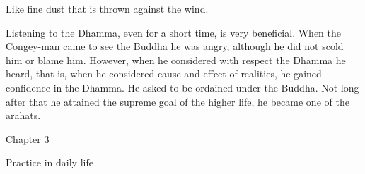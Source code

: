 \documentclass[12pt,twoside]{article}
\begin{document}
Like fine dust that is thrown against the wind.


\bigskip

Listening to the Dhamma, even for a short time, is very beneficial. When
the Congey{}-man came to see the Buddha he was angry, although he did
not scold him or blame him. However, when he considered with respect
the Dhamma he heard, that is, when he considered cause and effect of
realities, he gained confidence in the Dhamma. He asked to be ordained
under the Buddha. Not long after that he attained the supreme goal of
the higher life, he became one of the arahats. 


\bigskip


\bigskip

\clearpage
Chapter 3


\bigskip


\bigskip

Practice in daily life


\bigskip


\bigskip
\end{document}
